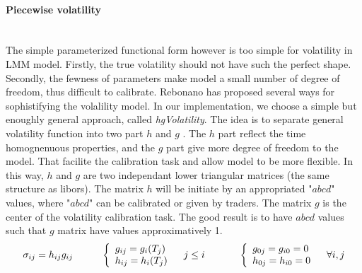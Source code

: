 \documentclass[a4paper,10pt]{article}
\begin{document}
\paragraph{Piecewise volatility}\mbox{} \\
The simple parameterized functional form \cite{eq:abcd} however is too simple for volatility in LMM model. Firstly, the true volatility should not have such the perfect shape. Secondly, the fewness of parameters make model a small number of degree of freedom, thus difficult to calibrate. Rebonano has proposed several ways for sophistifying the volalility model. In our implementation, we choose a simple but enoughly general approach, called \textit{hgVolatility}. The idea is to separate general  volatility function into two part $h$ and $g$ . The $h$ part reflect the time homognenuous properties, and the $g$ part give  more degree of freedom to the model. That facilite the calibration task and allow model to be more flexible. In this way, $h$ and $g$ are two independant lower triangular matrices (the same structure as libors). The matrix $h$ will be initiate by an appropriated "$abcd$" values, where "$abcd$" can be calibrated or given by traders. The matrix $g$ is the center of the volatility calibration task. The good result is to have $abcd$ values such that $g$ matrix have values approximatively 1.
\[
\sigma_{ij} = h_{ij}g_{ij}
\hspace{1cm}
\left\{
\begin{array}{l}
g_{ij}= g_i(T_j) \\
h_{ij}= h_i(T_j)
\end{array}
\right.
\hspace{0.3cm}
j \leq i
\hspace{1.2cm}
\left\{
\begin{array}{l}
g_{0j}=g_{i0}=0 \\
h_{0j}=h_{i0}=0
\end{array}
\right.
\hspace{0.3cm}
\forall i,j
\]
\end{document}
